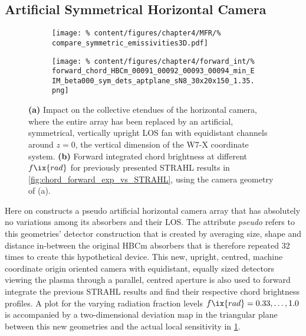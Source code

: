         \subsection*{Artificial Symmetrical Horizontal Camera}%
%
            \begin{figure}[t]%
                \centering%
                \begin{subfigure}{0.47\textwidth}%
                    \texttt{[image: \%
                        content/figures/chapter4/MFR/\%
                        compare\_symmetric\_emissivities3D.pdf]}%
                    \caption{}%
                \end{subfigure}%
                \hfill%
                \begin{subfigure}{0.47\textwidth}%
                    \texttt{[image: \%
                        content/figures/chapter4/forward\_int/\%
                        forward\_chord\_HBCm\_00091\_00092\_00093\_00094\_min\_EIM\_beta000\_sym\_dets\_aptplane\_sN8\_30x20x150\_1.35.png]}%
                    \caption{}%
                \end{subfigure}%
                \caption{\textbf{(a)} Impact on the collective etendues of the horizontal camera, where the entire array has been replaced by an artificial, symmetrical, vertically upright LOS fan with equidistant channels around $z=0$, the vertical dimension of the W7-X coordinate system. \textbf{(b)} Forward integrated chord brightness at different $f\ix{rad}$ for previously presented STRAHL results in \cref{fig:chord_forward_exp_vs_STRAHL}, using the camera geometry of (a).}\label{fig:geometry_forward_symmetric}%
            \end{figure}%
%
            Here on constructs a pseudo artificial horizontal camera array that has absolutely no variations among its absorbers and their LOS. The attribute \textit{pseudo} refers to this geometries' detector construction that is created by averaging size, shape and distance in-between the original HBCm absorbers that is therefore repeated 32 times to create this hypothetical device. This new, upright, centred, machine coordinate origin oriented camera with equidistant, equally sized detectors viewing the plasma through a parallel, centred aperture is also used to forward integrate the previous STRAHL results and find their respective chord brightness profiles. A plot for the varying radiation fraction levels $f\ix{rad}=0.33,\dots,1.0$ is accompanied by a two-dimensional deviation map in the triangular plane between this new geometries and the actual local sensitivity in \cref{fig:geometry_forward_symmetric}.\\%
